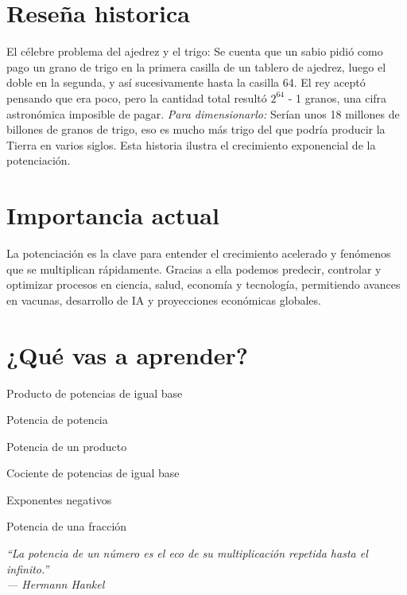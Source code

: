 

\vspace{2em} %

\section*{Reseña historica}
\begin{reseñaplana}
El célebre problema del ajedrez y el trigo:
Se cuenta que un sabio pidió como pago un grano de trigo en la primera casilla de un tablero de ajedrez, 
luego el doble en la segunda, y así sucesivamente hasta la casilla 64. El rey aceptó pensando que era poco, 
pero la cantidad total resultó $2^{64}$ - 1 granos, una cifra astronómica imposible de pagar.
\textit{Para dimensionarlo:} Serían unos 18 millones de billones de granos de trigo, eso es mucho más trigo 
del que podría producir la Tierra en varios siglos.
Esta historia ilustra el crecimiento exponencial de la potenciación.
\end{reseñaplana}

\section*{Importancia actual}
\begin{reseñaplana}
La potenciación es la clave para entender el crecimiento acelerado y 
fenómenos que se multiplican rápidamente. Gracias a ella podemos predecir, controlar y 
optimizar procesos en ciencia, salud, economía y tecnología, permitiendo avances en vacunas, 
desarrollo de IA y proyecciones económicas globales.
\end{reseñaplana}

\section*{¿Qué vas a aprender?}
\begin{reseñaitem}
  \item Producto de potencias de igual base
  \item Potencia de potencia
  \item Potencia de un producto
  \item Cociente de potencias de igual base
  \item Exponentes negativos
  \item Potencia de una fracción
\end{reseñaitem}

\vspace{1.5cm} %
\begin{flushright}
  {\fontsize{12}{14}\selectfont\itshape
  ``La potencia de un número es el eco de su multiplicación repetida hasta el infinito.''\\[6pt]
  — Hermann Hankel}%
\end{flushright}



